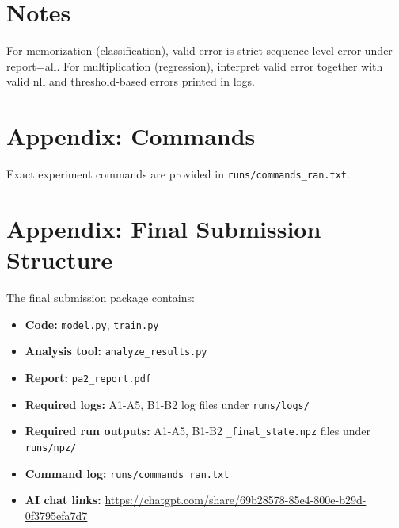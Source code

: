 \documentclass[11pt]{article}
\begin{document}
\section{Notes}
For memorization (classification), valid error is strict sequence-level error under report=all. For multiplication (regression), interpret valid error together with valid nll and threshold-based errors printed in logs.

\section{Appendix: Commands}
Exact experiment commands are provided in \texttt{runs/commands\_ran.txt}.

\section{Appendix: Final Submission Structure}
The final submission package contains:
\begin{itemize}
\item \textbf{Code:} \texttt{model.py}, \texttt{train.py}
\item \textbf{Analysis tool:} \texttt{analyze\_results.py}
\item \textbf{Report:} \texttt{pa2\_report.pdf}
\item \textbf{Required logs:} A1-A5, B1-B2 log files under \texttt{runs/logs/}
\item \textbf{Required run outputs:} A1-A5, B1-B2 \texttt{\_final\_state.npz} files under \texttt{runs/npz/}
\item \textbf{Command log:} \texttt{runs/commands\_ran.txt}
\item \textbf{AI chat links:} \url{https://chatgpt.com/share/69b28578-85e4-800e-b29d-0f3795efa7d7}
\end{itemize}
\end{document}
